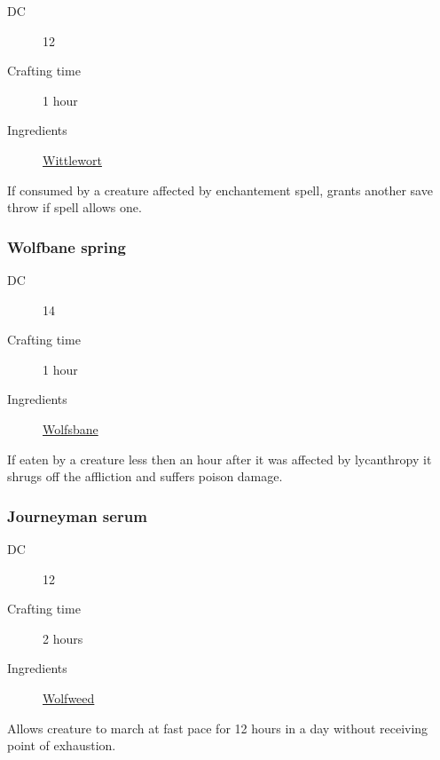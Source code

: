 \begin{description}
\item [DC] 12
\item [Crafting time] 1 hour
\item [Ingredients] \hyperref[Wittlewort]{Wittlewort}
\end{description}

If consumed by a creature affected by enchantement spell, grants another save throw if spell allows one.

\subsubsection{Wolfbane spring}
\label{Wolfbane spring}

\begin{description}
\item [DC] 14
\item [Crafting time] 1 hour
\item [Ingredients] \hyperref[Wolfsbane]{Wolfsbane}
\end{description}

If eaten by a creature less then an hour after it was affected by lycanthropy it shrugs off 
the affliction and suffers  poison damage.

\subsubsection{Journeyman serum}

\begin{description}
\item [DC] 12
\item [Crafting time] 2 hours
\item [Ingredients] \hyperref[Wolfweed]{Wolfweed}
\end{description}

Allows creature to march at fast pace for 12 hours in a day without receiving point of exhaustion.
